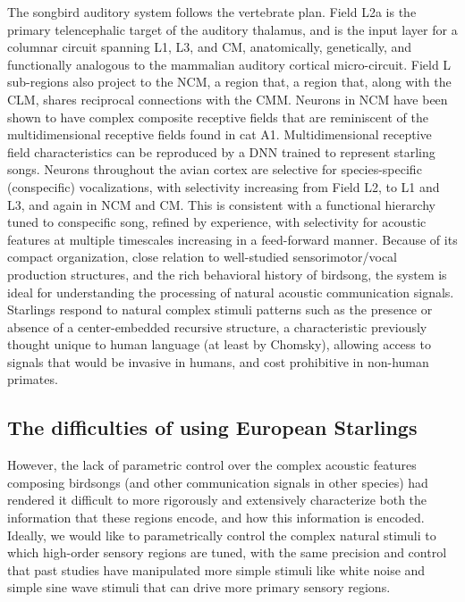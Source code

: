 The songbird auditory system follows the vertebrate plan\cite{Carr1992}. Field L2a is the primary telencephalic target of the auditory thalamus\cite{p05432}, and is the input layer for a columnar circuit spanning L1, L3, and \ac{CM}, anatomically\cite{Wang2010a,p10330}, genetically\cite{Dugas-Ford2012}, and functionally\cite{Calabrese2015} analogous to the mammalian auditory cortical micro-circuit. Field L sub-regions also project to the \ac{NCM}, a region that, a region that, along with the \ac{CLM}, shares reciprocal connections with the \ac{CMM}. Neurons in \ac{NCM} have been shown to have complex composite receptive fields\cite{kozlov2016central} that are reminiscent of the multidimensional receptive fields found in cat A1\cite{atencio2008cooperative}. Multidimensional receptive field characteristics can be reproduced by a \ac{DNN}\cite{kozlov2016central} trained to represent starling songs. Neurons throughout the avian cortex are selective for species-specific (conspecific) vocalizations\cite{Bonke1979,Leppelsack1976,Muller1985}, with selectivity increasing from Field L2, to L1 and L3\cite{Theunissen2004,Theunissen1998,Theunissen2000}, and again in \ac{NCM} and \ac{CM}\cite{Calabrese2015,Muller1985,Grace2003,Bonke1979,Leppelsack1976,p02120,Gentner2004,Thompson2010,Jeanne2011}. This is consistent with a functional hierarchy tuned to conspecific song\cite{Hsu2004,Woolley2005}, refined by experience\cite{p02120,Sockman2002,Sockman2005,Phan2006,Thompson2010,Jeanne2011}, with selectivity for acoustic features at multiple timescales increasing in a feed-forward manner\cite{Rose1988,Kaas2000,Binder2000,VanEssen1992}. Because of its compact organization, close relation to well-studied sensorimotor/vocal production structures, and the rich behavioral history of birdsong, the system is ideal for understanding the processing of natural acoustic communication signals.
Starlings respond to natural complex stimuli patterns such as the presence or absence of a center-embedded recursive structure\cite{gentner2006recursive,comins2014auditory,comins2014temporal}, a characteristic previously thought unique to human language (at least by Chomsky), allowing access to signals that would be invasive in humans, and cost prohibitive in non-human primates.

\subsection{The difficulties of using European Starlings}

However, the lack of parametric control over the complex acoustic features composing birdsongs (and other communication signals in other species) had rendered it difficult to more rigorously and extensively characterize both the information that these regions encode, and how this information is encoded.  Ideally, we would like to parametrically control the complex natural stimuli to which high-order sensory regions are tuned, with the same precision and control that past studies have manipulated more simple stimuli like white noise and simple sine wave stimuli that can drive more primary sensory regions.


